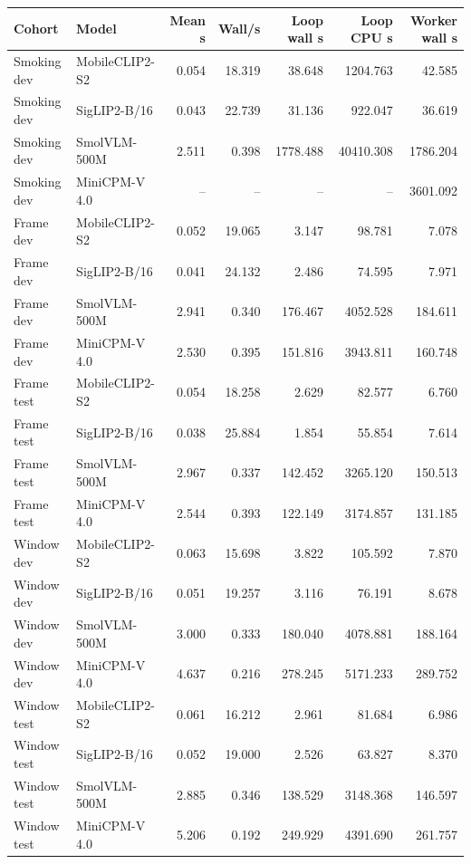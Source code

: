 \begin{longtable}{llrrrrr}
\toprule
Cohort & Model & Mean s & Wall/s & Loop wall s & Loop CPU s & Worker wall s \\
\midrule\endhead
Smoking dev & MobileCLIP2-S2 & 0.054 & 18.319 & 38.648 & 1204.763 & 42.585 \\
Smoking dev & SigLIP2-B/16 & 0.043 & 22.739 & 31.136 & 922.047 & 36.619 \\
Smoking dev & SmolVLM-500M & 2.511 & 0.398 & 1778.488 & 40410.308 & 1786.204 \\
Smoking dev & MiniCPM-V 4.0 & -- & -- & -- & -- & 3601.092 \\
Frame dev & MobileCLIP2-S2 & 0.052 & 19.065 & 3.147 & 98.781 & 7.078 \\
Frame dev & SigLIP2-B/16 & 0.041 & 24.132 & 2.486 & 74.595 & 7.971 \\
Frame dev & SmolVLM-500M & 2.941 & 0.340 & 176.467 & 4052.528 & 184.611 \\
Frame dev & MiniCPM-V 4.0 & 2.530 & 0.395 & 151.816 & 3943.811 & 160.748 \\
Frame test & MobileCLIP2-S2 & 0.054 & 18.258 & 2.629 & 82.577 & 6.760 \\
Frame test & SigLIP2-B/16 & 0.038 & 25.884 & 1.854 & 55.854 & 7.614 \\
Frame test & SmolVLM-500M & 2.967 & 0.337 & 142.452 & 3265.120 & 150.513 \\
Frame test & MiniCPM-V 4.0 & 2.544 & 0.393 & 122.149 & 3174.857 & 131.185 \\
Window dev & MobileCLIP2-S2 & 0.063 & 15.698 & 3.822 & 105.592 & 7.870 \\
Window dev & SigLIP2-B/16 & 0.051 & 19.257 & 3.116 & 76.191 & 8.678 \\
Window dev & SmolVLM-500M & 3.000 & 0.333 & 180.040 & 4078.881 & 188.164 \\
Window dev & MiniCPM-V 4.0 & 4.637 & 0.216 & 278.245 & 5171.233 & 289.752 \\
Window test & MobileCLIP2-S2 & 0.061 & 16.212 & 2.961 & 81.684 & 6.986 \\
Window test & SigLIP2-B/16 & 0.052 & 19.000 & 2.526 & 63.827 & 8.370 \\
Window test & SmolVLM-500M & 2.885 & 0.346 & 138.529 & 3148.368 & 146.597 \\
Window test & MiniCPM-V 4.0 & 5.206 & 0.192 & 249.929 & 4391.690 & 261.757 \\
\bottomrule
\end{longtable}
